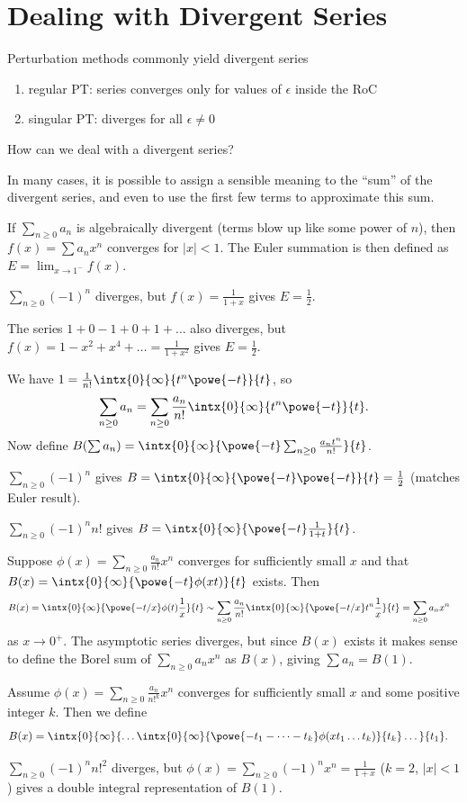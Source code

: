 \documentclass[english, parskip=full]{scrbook}
\newcommand{\definition}[2]{\begin{tcolorbox}[colback=colorbackgrounddefinition,colframe=colordefinition, breakable,enhanced,title=\textbf{#1}.]#2\end{tcolorbox}}
\newcommand{\example}[3]{\begin{tcolorbox}[colback=colorbackgroundexample,colframe=colorexample, breakable,enhanced,title={\textbf{#1}: #2.}]#3\end{tcolorbox}}
\begin{document}
\section{Dealing with Divergent Series}
Perturbation methods commonly yield divergent series
\begin{enumerate}
\item regular PT: series converges only for values of $\epsilon$ inside the RoC
\item singular PT: diverges for all $\epsilon \neq 0$
\end{enumerate}
How can we deal with a divergent series?

In many cases, it is possible to assign a sensible meaning to the \enquote{sum} of the divergent series, and even to use the first few terms to approximate this sum.
\definition{Euler Summation}{
If $\sum_{n\ge 0} a_n$ is algebraically divergent (terms blow up like some power of $n$), then $f(x)=\sum a_nx^n$ converges for $|x|<1$.
The Euler summation is then defined as $E=\lim_{x\rightarrow 1^-} f(x)$.
\example{Examples}{}{
$\sum_{n\ge 0} (-1)^n$ diverges, but $f(x)=\frac{1}{1+x}$ gives $E=\frac{1}{2}$.

The series $1+0-1+0+1+\dots$ also diverges, but $f(x) = 1-x^2+x^4+\dots=\frac{1}{1+x^2}$ gives $E=\frac{1}{2}$.
}
}
\definition{Borel Summation}{
We have $1 = \frac{1}{n!} \intx{0}{\infty}{t^n\powe{-t}}{t}$, so
\begin{align}
\sum_{n\ge 0} a_n = \sum_{n\ge 0} \frac{a_n}{n!} \intx{0}{\infty}{t^n\powe{-t}}{t}.
\end{align}
Now define $B(\sum a_n) = \intx{0}{\infty}{\powe{-t} \sum_{n\ge 0} \frac{a_n t^n}{n!}}{t}$.
\example{Examples}{}{
$\sum_{n\ge 0} (-1)^n$ gives $B=\intx{0}{\infty}{\powe{-t} \powe{-t}}{t} = \frac{1}{2}$ (matches Euler result).

$\sum_{n\ge 0} (-1)^n n!$ gives $B=\intx{0}{\infty}{\powe{-t} \frac{1}{1+t}}{t}$.
}
Suppose $\phi(x)=\sum_{n\ge 0} \frac{a_n}{n!}x^n$ converges for sufficiently small $x$ and that $B(x)=\intx{0}{\infty}{\powe{-t}\phi(xt)}{t}$ exists.
Then
\begin{align}
B(x) &= \intx{0}{\infty}{\powe{-t/x}\phi(t) \frac{1}{x}}{t} \sim \sum_{n\ge 0} \frac{a_n}{n!} \intx{0}{\infty}{\powe{-t/x} t^n \frac{1}{x}}{t}=\sum_{n\ge 0} a_nx^n
\end{align}
as $x\rightarrow 0^+$.
The asymptotic series diverges, but since $B(x)$ exists it makes sense to define the Borel sum of $\sum_{n\ge 0} a_n x^n$ as $B(x)$, giving $\sum a_n=B(1)$.
}
\definition{Generalized Borel Summation}{
Assume $\phi(x)=\sum_{n\ge 0} \frac{a_n}{n!^k} x^n$ converges for sufficiently small $x$ and some positive integer $k$.
Then we define 
\begin{align}
B(x) &= \intx{0}{\infty}{\dots \intx{0}{\infty}{\powe{-t_1-\dots-t_k} \phi(xt_1\dots t_k)}{t_k}\dots}{t_1}.
\end{align}
\example{Example}{}{
$\sum_{n\ge 0} (-1)^n n!^2$ diverges, but $\phi(x) = \sum_{n\ge 0} (-1)^n x^n = \frac{1}{1+x}$ ($k=2$, $|x|<1$) gives a double integral representation of $B(1)$.
}
}
\end{document}
